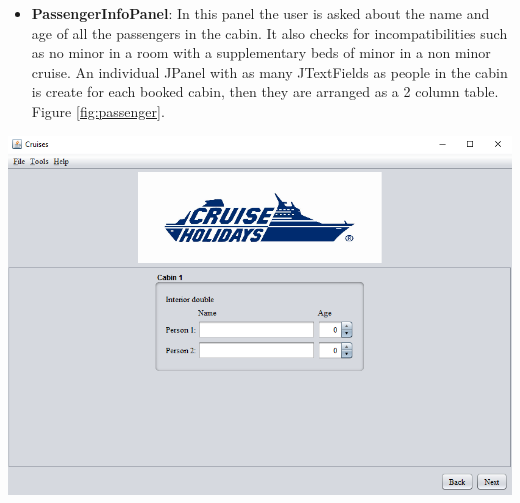 \documentclass[11pt]{article}
\begin{document}
	\begin{qn}
		\begin{itemize}
	   	    \item \textbf{PassengerInfoPanel}: In this panel the user is asked about the name and age of all the passengers in the cabin. It also checks for incompatibilities such as no minor in a room with a supplementary beds of minor in a non minor cruise. An individual JPanel with as many JTextFields as people in the cabin is create for each booked cabin, then they are arranged as a 2 column table. Figure \ref{fig:passenger}.
	    \end{itemize}
	    \begin{center}
		    \begin{minipage}{0.8\linewidth}
		   	   	\includegraphics[width=\linewidth]{images/passenger.png}
		   	   	\label{fig:passenger}
		    \end{minipage}
	    \end{center}
    \end{qn}
    
\end{document}
